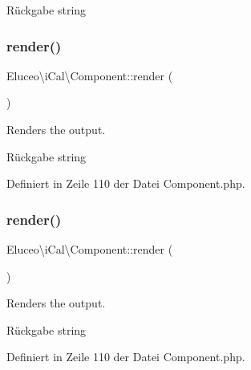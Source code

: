 \begin{DoxyReturn}{Rückgabe}
string 
\end{DoxyReturn}
\mbox{\label{class_eluceo_1_1i_cal_1_1_component_a66f0174f6e8d985c704378470f326aff}} 
\subsubsection{\texorpdfstring{render()}{render()}\hspace{0.1cm}{\footnotesize\ttfamily [1/3]}}
{\footnotesize\ttfamily Eluceo\textbackslash{}i\+Cal\textbackslash{}\+Component\+::render (\begin{DoxyParamCaption}{ }\end{DoxyParamCaption})}

Renders the output.

\begin{DoxyReturn}{Rückgabe}
string 
\end{DoxyReturn}


Definiert in Zeile 110 der Datei Component.\+php.

\mbox{\label{class_eluceo_1_1i_cal_1_1_component_a66f0174f6e8d985c704378470f326aff}} 
\subsubsection{\texorpdfstring{render()}{render()}\hspace{0.1cm}{\footnotesize\ttfamily [2/3]}}
{\footnotesize\ttfamily Eluceo\textbackslash{}i\+Cal\textbackslash{}\+Component\+::render (\begin{DoxyParamCaption}{ }\end{DoxyParamCaption})}

Renders the output.

\begin{DoxyReturn}{Rückgabe}
string 
\end{DoxyReturn}


Definiert in Zeile 110 der Datei Component.\+php.

